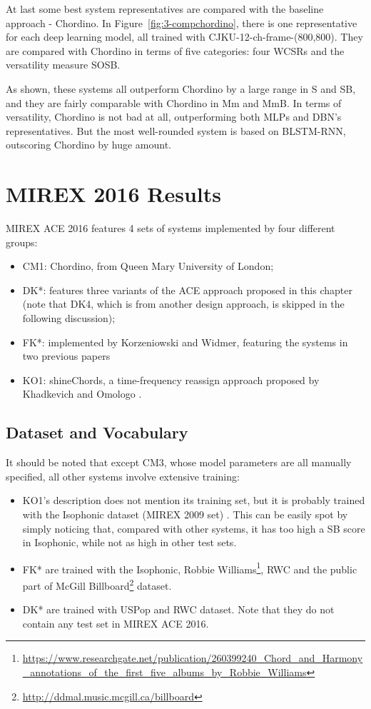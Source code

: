 At last some best system representatives are compared with the baseline approach - Chordino. In Figure~\ref{fig:3-compchordino}, there is one representative for each deep learning model, all trained with CJKU-12-ch-frame-(800,800). They are compared with Chordino in terms of five categories: four WCSRs and the versatility measure SOSB.

As shown, these systems all outperform Chordino by a large range in S and SB, and they are fairly comparable with Chordino in Mm and MmB. In terms of versatility, Chordino is not bad at all, outperforming both MLPs and DBN's representatives. But the most well-rounded system is based on BLSTM-RNN, outscoring Chordino by huge amount.

\section{MIREX 2016 Results}
MIREX ACE 2016 features 4 sets of systems implemented by four different groups:
\begin{itemize}
\item CM1: Chordino, from Queen Mary University of London;
\item DK*: features three variants of the ACE approach proposed in this chapter (note that DK4, which is from another design approach, is skipped in the following discussion);
\item FK*: implemented by Korzeniowski and Widmer, featuring the systems in two previous papers \cite{Korzeniowski2016feature,Korzeniowski2016convolutional}
\item KO1: shineChords, a time-frequency reassign approach proposed by Khadkevich and Omologo \cite{khadkevich2011time}.
\end{itemize}

\subsection{Dataset and Vocabulary}
It should be noted that except CM3, whose model parameters are all manually specified, all other systems involve extensive training:
\begin{itemize}
\item KO1's description does not mention its training set, but it is probably trained with the Isophonic dataset (MIREX 2009 set) \cite{burgoyne2014comparative}. This can be easily spot by simply noticing that, compared with other systems, it has too high a SB score in Isophonic, while not as high in other test sets.

\item FK* are trained with the Isophonic, Robbie Williams\footnote{\url{https://www.researchgate.net/publication/260399240\_Chord\_and\_Harmony\_annotations\_of\_the\_first\_five\_albums\_by\_Robbie\_Williams}}, RWC and the public part of McGill Billboard\footnote{\url{http://ddmal.music.mcgill.ca/billboard}} dataset.

\item DK* are trained with USPop and RWC dataset. Note that they do not contain any test set in MIREX ACE 2016.
\end{itemize}

